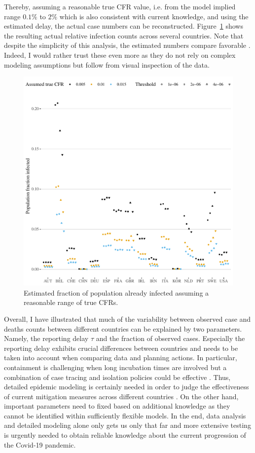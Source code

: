 \documentclass[fullpage,a4paper]{article}
\newcommand{\fig}[1]{Figure~\ref{fig:#1}}
\begin{document}
Thereby, assuming a reasonable true CFR value, i.e. from the model
implied range $0.1\%$ to $2\%$ which is also consistent with current
knowledge, and using the estimated delay, the actual case numbers can
be reconstructed. \fig{est_pop_frac} shows the resulting actual
relative infection counts across several countries. Note that despite
the simplicity of this analysis, the estimated numbers compare
favorable \cite{imperial2}. Indeed, I would rather trust these even
more as they do not rely on complex modeling assumptions but follow
from visual inspection of the data.
\begin{figure}
  \includegraphics[width=1\textwidth]{../figs/ecdc_est_pop_frac.pdf}
  \caption{\label{fig:est_pop_frac} Estimated fraction of population
    already infected assuming a reasonable range of true CFRs.}
\end{figure}

Overall, I have illustrated that much of the variability between
observed case and deaths counts between different countries can be
explained by two parameters. Namely, the reporting delay $\tau$ and
the fraction of observed cases. Especially the reporting delay
exhibits crucial differences between countries and needs to be taken
into account when comparing data and planning actions. In particular,
containment is challenging when long incubation times are involved
\cite{https://doi.org/10.1101/2020.03.25.20043109} but a combination
of case tracing and isolation policies could be effective
\cite{fraser04,kubinec}. Thus, detailed epidemic modeling is certainly
needed in order to judge the effectiveness of current mitigation
measures across different countries \cite{imperial2,arxiv:2004.01105}.
On the other hand, important parameters need to fixed based on
additional knowledge as they cannot be identified within sufficiently
flexible models. In the end, data analysis and detailed modeling alone
only gets us only that far and more extensive testing is urgently
needed to obtain reliable knowledge about the current progression of
the Covid-19 pandemic.
\end{document}

